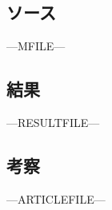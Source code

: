 \section{}
\subsection{ソース}
---MFILE---

\subsection{結果}
---RESULTFILE---

\subsection{考察}
---ARTICLEFILE---

